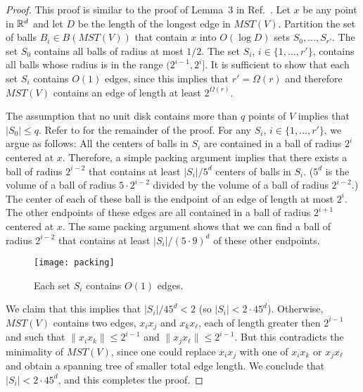 \documentclass{patmorin}
\newcommand{\mst}{\mathit{MST}}
\begin{document}
\begin{proof}
This proof is similar to the proof of Lemma~3 in Ref.~\cite{msz11}. Let $x$
be any point in $\mathbb{R}^d$ and let $D$ be the length of the longest edge in
$\mst(V)$.  Partition the set of balls $B_i\in B(\mst(V))$ that contain
$x$ into $O(\log D)$ sets $S_0,\ldots,S_{r'}$. The set $S_0$ contains
all balls of radius at most $1/2$.  The set $S_i$, $i\in\{1,\ldots,r'\}$,
contains all balls whose radius is in the range $(2^{i-1},2^i]$.  It is
sufficient to show that each set $S_i$ contains $O(1)$ edges, since this
implies that $r'=\Omega(r)$ and therefore $\mst(V)$ contains an edge
of length at least $2^{\Omega(r)}$.

The assumption that no unit disk contains more than $q$ points of $V$
implies that $|S_0|\le q$.  Refer to  for the remainder of
the proof.  For any $S_i$, $i\in\{1,\ldots,r'\}$, we argue as follows:
All the centers of balls in $S_i$ are contained in a ball of radius
$2^{i}$ centered at $x$.  Therefore, a simple packing argument implies
that there exists a ball of radius $2^{i-2}$ that contains at least
$|S_i|/5^d$ centers of balls in $S_i$.  ($5^d$ is the volume of a ball
of radius $5\cdot2^{i-2}$ divided by the volume of a ball of radius
$2^{i-2}$.)  The center of each of these ball is the endpoint of an
edge of length at most $2^i$.  The other endpoints of these edges are
all contained in a ball of radius $2^{i+1}$ centered at $x$.  The same
packing argument shows that we can find a ball of radius $2^{i-2}$
that contains at least $|S_i|/(5\cdot 9)^d$ of these other endpoints.

\begin{figure}
  \begin{center}
    \texttt{[image: packing]}
  \end{center}
  \caption{Each set $S_i$ contains $O(1)$ edges.}
\end{figure}

We claim that this implies that $|S_i|/45^d< 2$ (so $|S_i|< 2\cdot
45^d$). Otherwise, $\mst(V)$ contains two edges, $x_ix_j$ and
$x_kx_\ell$, each of length greater then $2^{i-1}$ and such that
$\|x_ix_k\| \le 2^{i-1}$ and $\|x_jx_\ell\|\le 2^{i-1}$.  But this
contradicts the minimality of $\mst(V)$, since one could replace
$x_ix_j$ with one of $x_ix_k$ or $x_jx_\ell$ and obtain a spanning tree
of smaller total edge length.  We conclude that $|S_i|< 2\cdot 45^d$,
and this completes the proof.
\end{proof}
\end{document}
